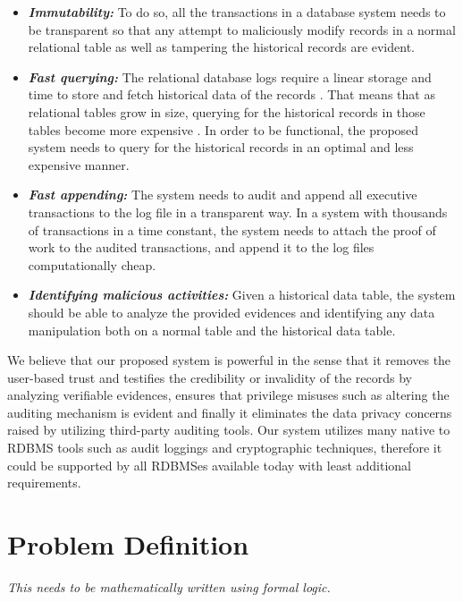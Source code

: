 		\begin{itemize}
			  \item \textbf{\textit{Immutability:}} To do so, all the transactions in a database system needs to be transparent so that any attempt to maliciously modify records in a normal relational table as well as tampering the historical records are evident.
			  \item \textbf{\textit{Fast querying:}} The relational database logs require a linear storage and time to store and fetch historical data of the records \cite{crosby2009tamper-evident}. That means that as relational tables grow in size, querying for the historical records in those tables become more expensive \cite{beirami2018snapshot}. In order to be functional, the proposed system needs to query for the historical records in an optimal and less expensive manner.\
			  \item \textbf{\textit{Fast appending:}} The system needs to audit and append all executive transactions to the log file in a transparent way. In a system with thousands of transactions in a time constant, the system needs to attach the proof of work to the audited transactions, and append it to the log files computationally cheap.
			  \item \textbf{\textit{Identifying malicious activities:}} Given a historical data table, the system should be able to analyze the provided evidences and identifying any data manipulation both on a normal table and the historical data table.
		\end{itemize} 
		We believe that our proposed system is powerful in the sense that it removes the user-based trust and testifies the credibility or invalidity of the records by analyzing verifiable evidences, ensures that privilege misuses such as altering the auditing mechanism is evident and finally it eliminates the data privacy concerns raised by utilizing third-party auditing tools. Our system utilizes many native to RDBMS tools such as audit loggings and cryptographic techniques, therefore it could be supported by all RDBMSes available today with least additional requirements.

	\section{Problem Definition} \label{sec:problem_definition}

	{\it This needs to be mathematically written using formal logic.}
